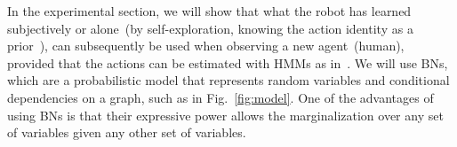 %

%
%
%

In the experimental section, we will show that what the robot has learned subjectively or alone~(by self-exploration, knowing the action identity as a prior~\cite{salvi:2012:smcb}), can subsequently be used when observing a new agent~(human), provided that the actions can be estimated with \acp{HMM} as in~\cite{saponaro:2013:crhri}. We will use \acfp{BN}, which are a probabilistic model that represents random variables and conditional dependencies on a graph, such as in Fig.~\ref{fig:model}. One of the advantages of using \acp{BN} is that their expressive power allows the marginalization over any set of variables given any other set of variables.
